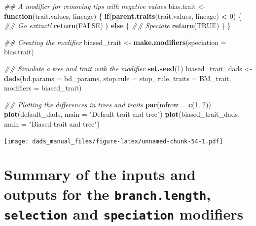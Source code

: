\documentclass[]{book}
\newenvironment{Shaded}{\begin{snugshade}}{\end{snugshade}}
\newcommand{\CommentTok}[1]{\textcolor[rgb]{0.56,0.35,0.01}{\textit{#1}}}
\newcommand{\ControlFlowTok}[1]{\textcolor[rgb]{0.13,0.29,0.53}{\textbf{#1}}}
\newcommand{\DataTypeTok}[1]{\textcolor[rgb]{0.13,0.29,0.53}{#1}}
\newcommand{\DecValTok}[1]{\textcolor[rgb]{0.00,0.00,0.81}{#1}}
\newcommand{\KeywordTok}[1]{\textcolor[rgb]{0.13,0.29,0.53}{\textbf{#1}}}
\newcommand{\NormalTok}[1]{#1}
\newcommand{\OperatorTok}[1]{\textcolor[rgb]{0.81,0.36,0.00}{\textbf{#1}}}
\newcommand{\OtherTok}[1]{\textcolor[rgb]{0.56,0.35,0.01}{#1}}
\newcommand{\StringTok}[1]{\textcolor[rgb]{0.31,0.60,0.02}{#1}}
\begin{document}
\begin{Shaded}
\begin{Highlighting}[]
\CommentTok{## A modifier for removing tips with negative values}
\NormalTok{bias.trait <-}\StringTok{ }\ControlFlowTok{function}\NormalTok{(trait.values, lineage) \{}
    \ControlFlowTok{if}\NormalTok{(}\KeywordTok{parent.traits}\NormalTok{(trait.values, lineage) }\OperatorTok{<}\StringTok{ }\DecValTok{0}\NormalTok{) \{}
        \CommentTok{## Go extinct!}
        \KeywordTok{return}\NormalTok{(}\OtherTok{FALSE}\NormalTok{)}
\NormalTok{    \} }\ControlFlowTok{else}\NormalTok{ \{}
        \CommentTok{## Speciate}
        \KeywordTok{return}\NormalTok{(}\OtherTok{TRUE}\NormalTok{)}
\NormalTok{    \}}
\NormalTok{\}}

\CommentTok{## Creating the modifier}
\NormalTok{biased_trait <-}\StringTok{ }\KeywordTok{make.modifiers}\NormalTok{(}\DataTypeTok{speciation =}\NormalTok{ bias.trait)}

\CommentTok{## Simulate a tree and trait with the modifier}
\KeywordTok{set.seed}\NormalTok{(}\DecValTok{1}\NormalTok{)}
\NormalTok{biased_trait_dads <-}\StringTok{ }\KeywordTok{dads}\NormalTok{(}\DataTypeTok{bd.params =}\NormalTok{ bd_params,}
                          \DataTypeTok{stop.rule =}\NormalTok{ stop_rule,}
                          \DataTypeTok{traits    =}\NormalTok{ BM_trait,}
                          \DataTypeTok{modifiers =}\NormalTok{ biased_trait)}

\CommentTok{## Plotting the differences in trees and traits}
\KeywordTok{par}\NormalTok{(}\DataTypeTok{mfrow =} \KeywordTok{c}\NormalTok{(}\DecValTok{1}\NormalTok{, }\DecValTok{2}\NormalTok{))}
\KeywordTok{plot}\NormalTok{(default_dads, }\DataTypeTok{main =} \StringTok{"Default trait and tree"}\NormalTok{)}
\KeywordTok{plot}\NormalTok{(biased_trait_dads, }\DataTypeTok{main =} \StringTok{"Biased trait and tree"}\NormalTok{)}
\end{Highlighting}
\end{Shaded}

\texttt{[image: dads\_manual\_files/figure-latex/unnamed-chunk-54-1.pdf]}

\hypertarget{summarymodifiers}{%
\section{\texorpdfstring{Summary of the inputs and outputs for the \texttt{branch.length}, \texttt{selection} and \texttt{speciation} modifiers}{Summary of the inputs and outputs for the branch.length, selection and speciation modifiers}}\label{summarymodifiers}}
\end{document}
